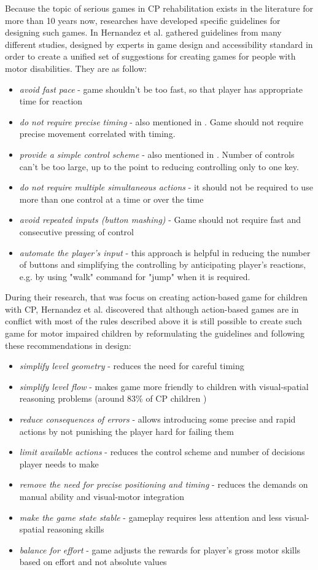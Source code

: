 Because the topic of serious games in CP rehabilitation exists in the literature for more than 10 years now, researches have developed specific guidelines for designing such games. In \cite{action} Hernandez et al. gathered guidelines from many different studies, designed by experts in game design and accessibility standard in order to create a unified set of suggestions for creating games for people with motor disabilities. They are as follow:
\begin{itemize}
\item \emph{avoid fast pace} - game shouldn't be too fast, so that player has appropriate time for reaction
\item \emph{do not require precise timing} - also mentioned in \cite{BBC,gag}. Game should not require precise movement correlated with timing.
\item \emph{provide a simple control scheme} - also mentioned in \cite{BBC,gag}. Number of controls can't be too large, up to the point to reducing controlling only to one key. 
\item \emph{do not require multiple simultaneous actions} - it should not be required to use more than one control at a time or over the time
\item \emph{avoid repeated inputs (button mashing)} - Game should not require fast and consecutive pressing of control
\item \emph{automate the player's input} - this approach is helpful in reducing the number of buttons and simplifying the controlling by anticipating player's reactions, e.g. by using "walk" command for "jump" when it is required.
\end{itemize}

During their research, that was focus on creating action-based game for children with CP, Hernandez et al. discovered that although action-based games are in conflict with most of the rules described above it is still possible to create such game for motor impaired children by reformulating the guidelines and following these recommendations in design:
\begin{itemize}
\item \emph{simplify level geometry} - reduces the need for careful timing
\item \emph{simplify level flow} - makes game more friendly to children with visual-spatial reasoning problems (around 83\% of CP children \cite{statistic}) 
\item \emph{reduce consequences of errors} - allows introducing some precise and rapid actions by not punishing the player hard for failing them
\item \emph{limit available actions} - reduces the control scheme and number of decisions player needs to make
\item \emph{remove the need for precise positioning and timing} - reduces the demands on manual ability and visual-motor integration
\item \emph{make the game state stable} - gameplay requires less attention and less visual-spatial reasoning skills
\item \emph{balance for effort} - game adjusts the rewards for player's gross motor skills based on effort and not absolute values
\end{itemize}
